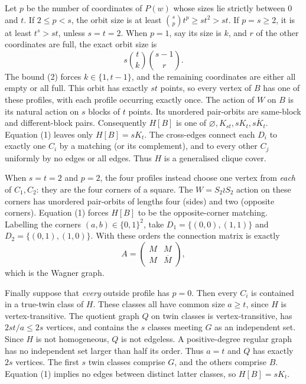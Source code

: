 \documentclass[11pt,a4paper]{article}
\begin{document}
Let \(p\) be the number of coordinates
of \(P(w)\) whose sizes lie strictly between
\(0\) and \(t\). If \(2\le p<s\),
the orbit size is at least
\(\binom sp t^p\ge st^2>st\).
If \(p=s\ge2\), it is at least
\(t^s>st\), unless \(s=t=2\).
When \(p=1\), say its size is \(k\),
and \(r\) of the other coordinates are
full, the exact orbit size is
\[
        s\binom tk\binom{s-1}{r}.
\]
The bound (2) forces
\(k\in\{1,t-1\}\), and the remaining
coordinates are either all empty or all
full. This orbit has exactly \(st\)
points, so every vertex of \(B\) has
one of these profiles, with each profile
occurring exactly once. The action of \(W\)
on \(B\) is its natural action on \(s\)
blocks of \(t\) points. Its unordered
pair-orbits are same-block and
different-block pairs. Consequently
\(H[B]\) is one of
\(\varnothing,K_{st},sK_t,\overline{sK_t}\).
Equation (1) leaves only \(H[B]=sK_t\).
The cross-edges connect each \(D_i\)
to exactly one \(C_i\) by a matching
(or its complement), and to every other
\(C_j\) uniformly by no edges or all
edges. Thus \(H\) is a generalised
clique cover.

When \(s=t=2\) and \(p=2\), the four
profiles instead choose one vertex from
\emph{each} of \(C_1,C_2\): they are
the four corners of a square.
The \(W=S_2\wr S_2\) action on these
corners has unordered pair-orbits of
lengths four (sides) and two
(opposite corners). Equation (1)
forces \(H[B]\) to be the
opposite-corner matching. Labelling
the corners \((a,b)\in\{0,1\}^2\),
take \(D_1=\{(0,0),(1,1)\}\) and
\(D_2=\{(0,1),(1,0)\}\).
With these orders the connection
matrix is exactly
\[
 A=\begin{pmatrix}
 M&M\\M&\overline M
 \end{pmatrix},
\]
which is the Wagner graph.

Finally suppose that \emph{every}
outside profile has \(p=0\).
Then every \(C_i\) is contained
in a true-twin class of \(H\).
These classes all have common size
\(a\ge t\), since \(H\) is vertex-transitive.
The quotient graph \(Q\) on twin
classes is vertex-transitive,
has \(2st/a\le2s\) vertices,
and contains the \(s\) classes
meeting \(G\) as an independent set.
Since \(H\) is not homogeneous,
\(Q\) is not edgeless. A
positive-degree regular graph has no
independent set larger than half its
order. Thus \(a=t\) and
\(Q\) has exactly \(2s\) vertices.
The first \(s\) twin classes comprise
\(G\), and the others comprise \(B\).
Equation (1) implies no edges between
distinct latter classes, so
\(H[B]=sK_t\).
\end{document}

